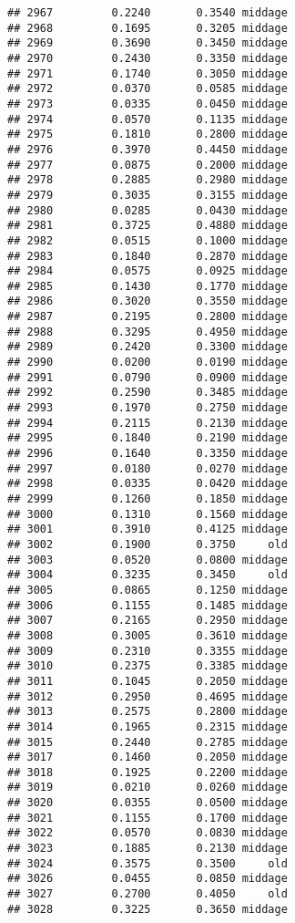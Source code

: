 \documentclass[
]{article}
\begin{document}
\begin{verbatim}
## 2967         0.2240       0.3540 middage
## 2968         0.1695       0.3205 middage
## 2969         0.3690       0.3450 middage
## 2970         0.2430       0.3350 middage
## 2971         0.1740       0.3050 middage
## 2972         0.0370       0.0585 middage
## 2973         0.0335       0.0450 middage
## 2974         0.0570       0.1135 middage
## 2975         0.1810       0.2800 middage
## 2976         0.3970       0.4450 middage
## 2977         0.0875       0.2000 middage
## 2978         0.2885       0.2980 middage
## 2979         0.3035       0.3155 middage
## 2980         0.0285       0.0430 middage
## 2981         0.3725       0.4880 middage
## 2982         0.0515       0.1000 middage
## 2983         0.1840       0.2870 middage
## 2984         0.0575       0.0925 middage
## 2985         0.1430       0.1770 middage
## 2986         0.3020       0.3550 middage
## 2987         0.2195       0.2800 middage
## 2988         0.3295       0.4950 middage
## 2989         0.2420       0.3300 middage
## 2990         0.0200       0.0190 middage
## 2991         0.0790       0.0900 middage
## 2992         0.2590       0.3485 middage
## 2993         0.1970       0.2750 middage
## 2994         0.2115       0.2130 middage
## 2995         0.1840       0.2190 middage
## 2996         0.1640       0.3350 middage
## 2997         0.0180       0.0270 middage
## 2998         0.0335       0.0420 middage
## 2999         0.1260       0.1850 middage
## 3000         0.1310       0.1560 middage
## 3001         0.3910       0.4125 middage
## 3002         0.1900       0.3750     old
## 3003         0.0520       0.0800 middage
## 3004         0.3235       0.3450     old
## 3005         0.0865       0.1250 middage
## 3006         0.1155       0.1485 middage
## 3007         0.2165       0.2950 middage
## 3008         0.3005       0.3610 middage
## 3009         0.2310       0.3355 middage
## 3010         0.2375       0.3385 middage
## 3011         0.1045       0.2050 middage
## 3012         0.2950       0.4695 middage
## 3013         0.2575       0.2800 middage
## 3014         0.1965       0.2315 middage
## 3015         0.2440       0.2785 middage
## 3017         0.1460       0.2050 middage
## 3018         0.1925       0.2200 middage
## 3019         0.0210       0.0260 middage
## 3020         0.0355       0.0500 middage
## 3021         0.1155       0.1700 middage
## 3022         0.0570       0.0830 middage
## 3023         0.1885       0.2130 middage
## 3024         0.3575       0.3500     old
## 3026         0.0455       0.0850 middage
## 3027         0.2700       0.4050     old
## 3028         0.3225       0.3650 middage

\end{verbatim}
\end{document}
